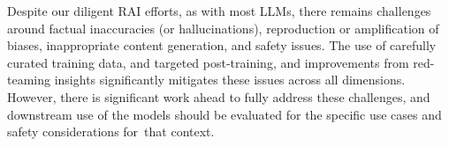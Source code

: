 \documentclass[11pt]{article}
\begin{document}
Despite our diligent RAI efforts, as with most LLMs, there remains challenges around factual inaccuracies (or hallucinations), reproduction or amplification of biases, inappropriate content generation, and safety issues. The use of carefully curated training data, and targeted post-training, and improvements from red-teaming insights significantly mitigates these issues across all dimensions. However, there is significant work ahead to fully  address these challenges, and downstream use of the models should be evaluated for the specific use cases and safety considerations for that context.  

\end{document}
